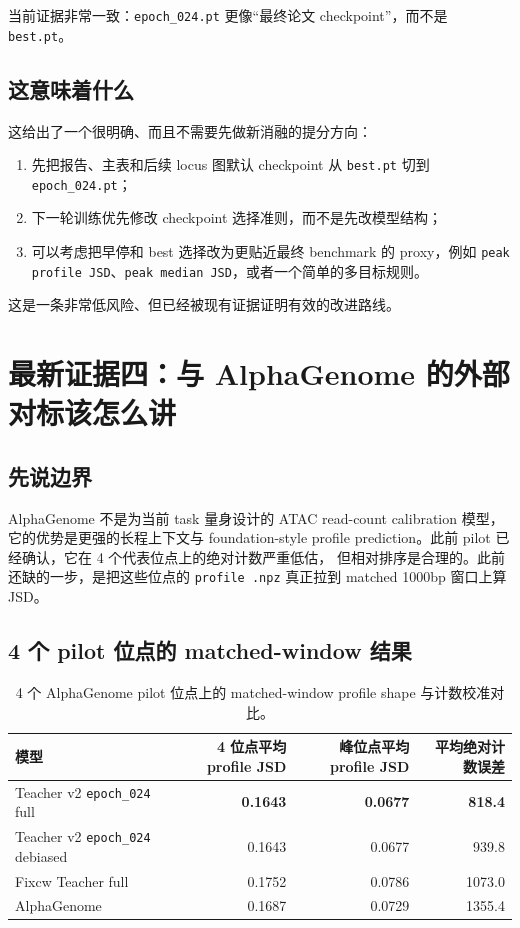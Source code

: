 \documentclass[11pt,a4paper]{ctexart}
\begin{document}
当前证据非常一致：\texttt{epoch\_024.pt} 更像“最终论文 checkpoint”，而不是 \texttt{best.pt}。

\subsection{这意味着什么}

这给出了一个很明确、而且不需要先做新消融的提分方向：
\begin{enumerate}[leftmargin=2em]
  \item 先把报告、主表和后续 locus 图默认 checkpoint 从 \texttt{best.pt} 切到
  \texttt{epoch\_024.pt}；
  \item 下一轮训练优先修改 checkpoint 选择准则，而不是先改模型结构；
  \item 可以考虑把早停和 best 选择改为更贴近最终 benchmark 的 proxy，例如
  \texttt{peak profile JSD}、\texttt{peak median JSD}，或者一个简单的多目标规则。
\end{enumerate}

这是一条非常低风险、但已经被现有证据证明有效的改进路线。

\section{最新证据四：与 AlphaGenome 的外部对标该怎么讲}

\subsection{先说边界}

AlphaGenome 不是为当前 task 量身设计的 ATAC read-count calibration 模型，它的优势是更强的长程上下文与
foundation-style profile prediction。此前 pilot 已经确认，它在 4 个代表位点上的绝对计数严重低估，
但相对排序是合理的。此前还缺的一步，是把这些位点的 \texttt{profile .npz} 真正拉到 matched 1000bp
窗口上算 JSD。

\subsection{4 个 pilot 位点的 matched-window 结果}

\begin{table}[H]
\centering
\small
\caption{4 个 AlphaGenome pilot 位点上的 matched-window profile shape 与计数校准对比。}
\begin{tabular}{lrrr}
\toprule
模型 & 4 位点平均 profile JSD & 峰位点平均 profile JSD & 平均绝对计数误差 \\
\midrule
Teacher v2 \texttt{epoch\_024} full & \textbf{0.1643} & \textbf{0.0677} & \textbf{818.4} \\
Teacher v2 \texttt{epoch\_024} debiased & 0.1643 & 0.0677 & 939.8 \\
Fixcw Teacher full & 0.1752 & 0.0786 & 1073.0 \\
AlphaGenome & 0.1687 & 0.0729 & 1355.4 \\
\bottomrule
\end{tabular}
\end{table}
\end{document}
